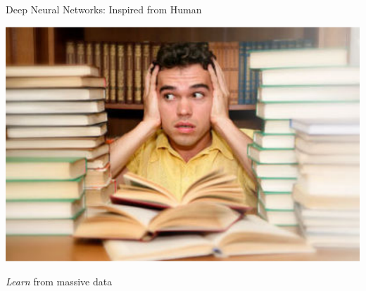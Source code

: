 \documentclass[first=dgreen,second=purple,logo=yellowexc]{aaltoslides}
\begin{document}
\begin{frame}{Deep Neural Networks: Inspired from Human}

     \centering
     \begin{minipage}{0.37\textwidth}
         \centering
         \includegraphics[width=0.9\columnwidth]{studying.pdf}

         \small
         \textit{Learn} from massive data
     \end{minipage}


\end{frame}
\end{document}
